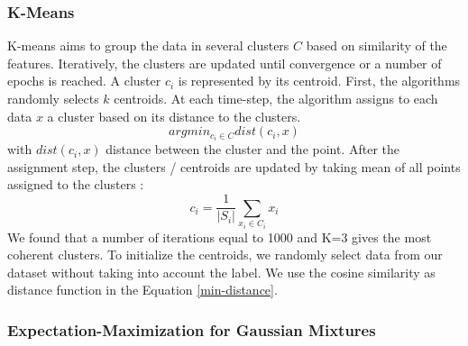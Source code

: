 \documentclass{llncs}
\begin{document}
\subsubsection{K-Means}

K-means aims to group the data in several clusters $C$ based on similarity of the features. Iteratively, the clusters are updated until convergence or a number of epochs is reached. A cluster $c_{i}$ is represented by its centroid.
First, the algorithms randomly selects $k$ centroids. At each time-step, the algorithm assigns to each data $x$ a cluster based on its distance to the clusters.
\begin{equation}
\label{min-distance}
	argmin_{c_{i}\in C} dist(c_{i},x)
\end{equation}
with $dist(c_{i},x)$ distance between the cluster and the point. 
After the assignment step, the clusters / centroids are updated by taking mean of all points assigned to the clusters :
\begin{equation}
c_{i} = \frac{1}{|S_{i}|}\sum\limits_{x_{i} \in C_{i}} x_{i}
\end{equation}
We found that a number of iterations equal to 1000 and K=3 gives the most coherent clusters. To initialize the centroids, we randomly select data from our dataset without taking into account the label. We use the cosine similarity as distance function in the Equation \ref{min-distance}.


\subsubsection{Expectation-Maximization for Gaussian Mixtures}
\end{document}
